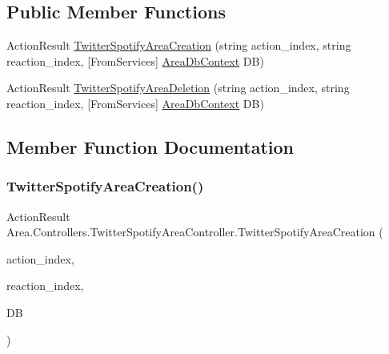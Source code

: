 \subsection*{Public Member Functions}
\begin{DoxyCompactItemize}
\item 
Action\+Result \mbox{\hyperlink{classArea_1_1Controllers_1_1TwitterSpotifyAreaController_afefbd31e974fda926960c312cc547c33}{Twitter\+Spotify\+Area\+Creation}} (string action\+\_\+index, string reaction\+\_\+index, \mbox{[}From\+Services\mbox{]} \mbox{\hyperlink{classArea_1_1DAT_1_1AreaDbContext}{Area\+Db\+Context}} DB)
\item 
Action\+Result \mbox{\hyperlink{classArea_1_1Controllers_1_1TwitterSpotifyAreaController_aff6aafc5961c78aae4b40218c8dea7fb}{Twitter\+Spotify\+Area\+Deletion}} (string action\+\_\+index, string reaction\+\_\+index, \mbox{[}From\+Services\mbox{]} \mbox{\hyperlink{classArea_1_1DAT_1_1AreaDbContext}{Area\+Db\+Context}} DB)
\end{DoxyCompactItemize}


\subsection{Member Function Documentation}
\mbox{\label{classArea_1_1Controllers_1_1TwitterSpotifyAreaController_afefbd31e974fda926960c312cc547c33}} 
\subsubsection{\texorpdfstring{Twitter\+Spotify\+Area\+Creation()}{TwitterSpotifyAreaCreation()}}
{\footnotesize\ttfamily Action\+Result Area.\+Controllers.\+Twitter\+Spotify\+Area\+Controller.\+Twitter\+Spotify\+Area\+Creation (\begin{DoxyParamCaption}\item[{string}]{action\+\_\+index,  }\item[{string}]{reaction\+\_\+index,  }\item[{\mbox{[}\+From\+Services\mbox{]} \mbox{\hyperlink{classArea_1_1DAT_1_1AreaDbContext}{Area\+Db\+Context}}}]{DB }\end{DoxyParamCaption})\hspace{0.3cm}{\ttfamily [inline]}}


